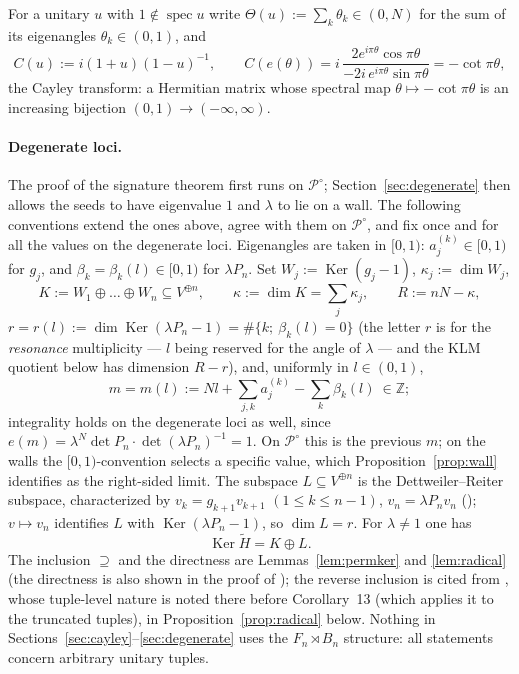 \documentclass[11pt]{article}
\theoremstyle{definition}
\newcommand{\Z}{\mathbb Z}
\newcommand{\Ht}{\widetilde H}
\newcommand{\Ker}{\operatorname{Ker}}
\begin{document}
For a unitary $u$ with $1\notin\operatorname{spec}u$ write
$\Theta(u):=\sum_k\theta_k\in(0,N)$ for the sum of its eigenangles
$\theta_k\in(0,1)$, and
\begin{equation}\label{eq:cayley-def}
C(u):=i(1+u)(1-u)^{-1},
\qquad
C(e(\theta))
=i\,\frac{2e^{i\pi\theta}\cos\pi\theta}{-2i\,e^{i\pi\theta}\sin\pi\theta}
=-\cot\pi\theta ,
\end{equation}
the Cayley transform: a Hermitian matrix whose spectral map
$\theta\mapsto-\cot\pi\theta$ is an increasing bijection
$(0,1)\to(-\infty,\infty)$.

\paragraph{Degenerate loci.} The proof of the signature theorem
first runs on $\mathcal P^{\circ}$; Section~\ref{sec:degenerate}
then allows the seeds to have eigenvalue $1$ and $\lambda$ to lie on a
wall. The following conventions extend the ones above, agree with
them on $\mathcal P^{\circ}$, and fix once and for all the values on
the degenerate loci. Eigenangles are taken in $[0,1)$:
$a_j^{(k)}\in[0,1)$ for $g_j$, and $\beta_k=\beta_k(l)\in[0,1)$ for
$\lambda P_n$. Set $W_j:=\Ker(g_j-1)$, $\kappa_j:=\dim W_j$,
\[
K:=W_1\oplus\dots\oplus W_n\subseteq V^{\oplus n},\qquad
\kappa:=\dim K=\textstyle\sum_j\kappa_j,\qquad
R:=nN-\kappa,
\]
$r=r(l):=\dim\Ker(\lambda P_n-1)=\#\{k;\ \beta_k(l)=0\}$ (the
letter $r$ is for the \emph{resonance} multiplicity --- $l$ being
reserved for the angle of $\lambda$ --- and the KLM quotient below
has dimension $R-r$), and, uniformly
in $l\in(0,1)$,
\[
m=m(l):=Nl+\sum_{j,k}a_j^{(k)}-\sum_k\beta_k(l)\ \in\Z ;
\]
integrality holds on the degenerate loci as well, since
$e(m)=\lambda^{N}\det P_n\cdot\det(\lambda P_n)^{-1}=1$. On
$\mathcal P^{\circ}$ this is the previous $m$; on the walls the
$[0,1)$-convention selects a specific value, which
Proposition~\ref{prop:wall} identifies as the right-sided limit. The
subspace $L\subseteq V^{\oplus n}$ is the Dettweiler--Reiter subspace,
characterized by $v_k=g_{k+1}v_{k+1}$ $(1\le k\le n-1)$,
$v_n=\lambda P_nv_n$ (\cite[Eq.~(9)]{N-KLM}); $v\mapsto v_n$ identifies
$L$ with $\Ker(\lambda P_n-1)$, so $\dim L=r$. For $\lambda\neq1$ one
has
\begin{equation}\label{eq:radical}
\Ker\Ht=K\oplus L .
\end{equation}
The inclusion $\supseteq$ and the directness are
Lemmas~\ref{lem:permker} and \ref{lem:radical} (the directness is
also shown in the proof of \cite[Thm.~16(iii)]{N-KLM}); the reverse
inclusion is cited from \cite[Thm.~9]{N-KLM}, whose tuple-level
nature is noted there before Corollary~13 (which applies it to the
truncated tuples), in Proposition~\ref{prop:radical} below.
Nothing in Sections~\ref{sec:cayley}--\ref{sec:degenerate} uses the
$F_n\rtimes B_n$ structure: all statements concern arbitrary unitary
tuples.
\end{document}
